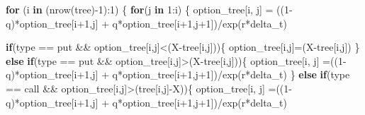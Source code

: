 \documentclass[
]{article}
\newenvironment{Shaded}{\begin{snugshade}}{\end{snugshade}}
\newcommand{\ControlFlowTok}[1]{\textcolor[rgb]{0.13,0.29,0.53}{\textbf{#1}}}
\newcommand{\DecValTok}[1]{\textcolor[rgb]{0.00,0.00,0.81}{#1}}
\newcommand{\FunctionTok}[1]{\textcolor[rgb]{0.00,0.00,0.00}{#1}}
\newcommand{\NormalTok}[1]{#1}
\newcommand{\OtherTok}[1]{\textcolor[rgb]{0.56,0.35,0.01}{#1}}
\newcommand{\SpecialCharTok}[1]{\textcolor[rgb]{0.00,0.00,0.00}{#1}}
\newcommand{\StringTok}[1]{\textcolor[rgb]{0.31,0.60,0.02}{#1}}
\begin{document}
\begin{Shaded}
\begin{Highlighting}[]
  \ControlFlowTok{for}\NormalTok{ (i }\ControlFlowTok{in}\NormalTok{ (}\FunctionTok{nrow}\NormalTok{(tree)}\SpecialCharTok{{-}}\DecValTok{1}\NormalTok{)}\SpecialCharTok{:}\DecValTok{1}\NormalTok{) \{}
    \ControlFlowTok{for}\NormalTok{(j }\ControlFlowTok{in} \DecValTok{1}\SpecialCharTok{:}\NormalTok{i) \{}
\NormalTok{      option\_tree[i, j] }\OtherTok{=}\NormalTok{ ((}\DecValTok{1}\SpecialCharTok{{-}}\NormalTok{q)}\SpecialCharTok{*}\NormalTok{option\_tree[i}\SpecialCharTok{+}\DecValTok{1}\NormalTok{,j] }\SpecialCharTok{+}\NormalTok{ q}\SpecialCharTok{*}\NormalTok{option\_tree[i}\SpecialCharTok{+}\DecValTok{1}\NormalTok{,j}\SpecialCharTok{+}\DecValTok{1}\NormalTok{])}\SpecialCharTok{/}\FunctionTok{exp}\NormalTok{(r}\SpecialCharTok{*}\NormalTok{delta\_t)}
      
      \ControlFlowTok{if}\NormalTok{(type }\SpecialCharTok{==} \StringTok{\textquotesingle{}put\textquotesingle{}} \SpecialCharTok{\&\&}\NormalTok{ option\_tree[i,j]}\SpecialCharTok{\textless{}}\NormalTok{(X}\SpecialCharTok{{-}}\NormalTok{tree[i,j]))\{}
\NormalTok{        option\_tree[i,j]}\OtherTok{=}\NormalTok{(X}\SpecialCharTok{{-}}\NormalTok{tree[i,j])}
\NormalTok{      \} }
      \ControlFlowTok{else} \ControlFlowTok{if}\NormalTok{(type }\SpecialCharTok{==} \StringTok{\textquotesingle{}put\textquotesingle{}} \SpecialCharTok{\&\&}\NormalTok{ option\_tree[i,j]}\SpecialCharTok{\textgreater{}}\NormalTok{(X}\SpecialCharTok{{-}}\NormalTok{tree[i,j]))\{}
\NormalTok{        option\_tree[i, j] }\OtherTok{=}\NormalTok{((}\DecValTok{1}\SpecialCharTok{{-}}\NormalTok{q)}\SpecialCharTok{*}\NormalTok{option\_tree[i}\SpecialCharTok{+}\DecValTok{1}\NormalTok{,j] }\SpecialCharTok{+}\NormalTok{ q}\SpecialCharTok{*}\NormalTok{option\_tree[i}\SpecialCharTok{+}\DecValTok{1}\NormalTok{,j}\SpecialCharTok{+}\DecValTok{1}\NormalTok{])}\SpecialCharTok{/}\FunctionTok{exp}\NormalTok{(r}\SpecialCharTok{*}\NormalTok{delta\_t)}
\NormalTok{      \} }
      \ControlFlowTok{else} \ControlFlowTok{if}\NormalTok{(type }\SpecialCharTok{==} \StringTok{\textquotesingle{}call\textquotesingle{}} \SpecialCharTok{\&\&}\NormalTok{ option\_tree[i,j]}\SpecialCharTok{\textgreater{}}\NormalTok{(tree[i,j]}\SpecialCharTok{{-}}\NormalTok{X))\{}
\NormalTok{        option\_tree[i, j] }\OtherTok{=}\NormalTok{((}\DecValTok{1}\SpecialCharTok{{-}}\NormalTok{q)}\SpecialCharTok{*}\NormalTok{option\_tree[i}\SpecialCharTok{+}\DecValTok{1}\NormalTok{,j] }\SpecialCharTok{+}\NormalTok{ q}\SpecialCharTok{*}\NormalTok{option\_tree[i}\SpecialCharTok{+}\DecValTok{1}\NormalTok{,j}\SpecialCharTok{+}\DecValTok{1}\NormalTok{])}\SpecialCharTok{/}\FunctionTok{exp}\NormalTok{(r}\SpecialCharTok{*}\NormalTok{delta\_t)}
        

\end{Highlighting}
\end{Shaded}
\end{document}
